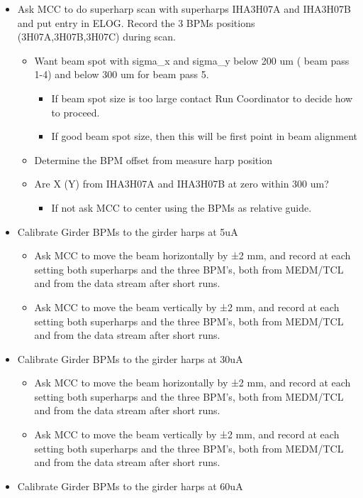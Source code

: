 \documentclass[]{article}
\begin{document}
	\begin{itemize}
		\item
		Ask MCC to do superharp scan with superharps IHA3H07A and IHA3H07B and
		put entry in ELOG. Record the 3 BPMs positions (3H07A,3H07B,3H07C)
		during scan.
		
		\begin{itemize}
			\item
			Want beam spot with sigma\_x and sigma\_y below 200 um ( beam pass
			1-4) and below 300 um for beam pass 5.
			
			\begin{itemize}
				\item
				If beam spot size is too large contact Run Coordinator to decide
				how to proceed.
				\item
				If good beam spot size, then this will be first point in beam
				alignment
			\end{itemize}
			\item
			Determine the BPM offset from measure harp position
			\item
			Are X (Y) from IHA3H07A and IHA3H07B at zero within 300 um?
			
			\begin{itemize}
				\item
				If not ask MCC to center using the BPMs as relative guide.
			\end{itemize}
		\end{itemize}
		\item
		Calibrate Girder BPMs to the girder harps at 5uA
		
		\begin{itemize}
			\item
			Ask MCC to move the beam horizontally by ±2 mm, and record at each
			setting both superharps and the three BPM's, both from MEDM/TCL and
			from the data stream after short runs.
			\item
			Ask MCC to move the beam vertically by ±2 mm, and record at each
			setting both superharps and the three BPM's, both from MEDM/TCL and
			from the data stream after short runs.
		\end{itemize}
		\item
		Calibrate Girder BPMs to the girder harps at 30uA
		
		\begin{itemize}
			\item
			Ask MCC to move the beam horizontally by ±2 mm, and record at each
			setting both superharps and the three BPM's, both from MEDM/TCL and
			from the data stream after short runs.
			\item
			Ask MCC to move the beam vertically by ±2 mm, and record at each
			setting both superharps and the three BPM's, both from MEDM/TCL and
			from the data stream after short runs.
		\end{itemize}
		\item
		Calibrate Girder BPMs to the girder harps at 60uA
		

\end{itemize}
\end{document}
